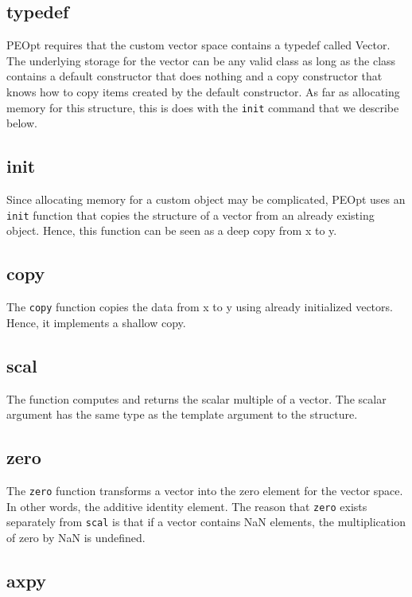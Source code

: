 \documentclass{report}
\begin{document}
\subsection{typedef}

       PEOpt requires that the custom vector space contains a typedef called Vector.  The underlying storage for the vector can be any valid class as long as the class contains a default constructor that does nothing and a copy constructor that knows how to copy items created by the default constructor.  As far as allocating memory for this structure, this is does with the \texttt{init} command that we describe below.

\subsection{init}

        Since allocating memory for a custom object may be complicated, PEOpt uses an \texttt{init} function that copies the structure of a vector from an already existing object.  Hence, this function can be seen as a deep copy from x to y.

\subsection{copy}
        
        The \texttt{copy} function copies the data from x to y using already initialized vectors.  Hence, it implements a shallow copy.

\subsection{scal}

        The  function computes and returns the scalar multiple of a vector.  The scalar argument has the same type as the template argument to the structure.

\subsection{zero}

        The \texttt{zero} function transforms a vector into the zero element for the vector space.  In other words, the additive identity element.  The reason that \texttt{zero} exists separately from \texttt{scal} is that if a vector contains NaN elements, the multiplication of zero by NaN is undefined.

\subsection{axpy}
\end{document}
